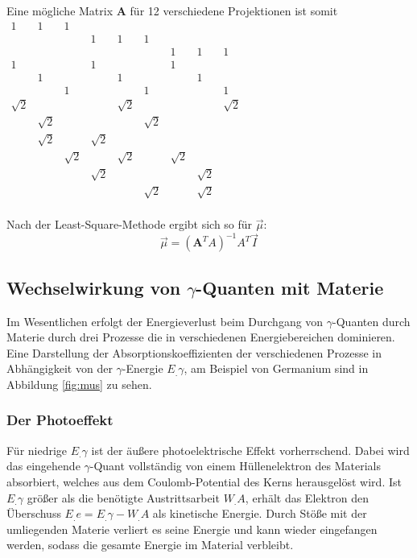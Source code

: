 Eine mögliche Matrix $\mathbf{A}$ für 12 verschiedene Projektionen ist somit
$
\begin{matrix}
1 & 1 & 1 &  &  &  &  &  &  \\
 &  &  & 1 & 1 & 1 &  &  &  \\
 &  &  &  &  &  & 1 & 1 & 1 \\
1 &  &  & 1 &  &  & 1 &  &  \\
 & 1 &  &  & 1 &  &  & 1 &  \\
 &  & 1 &  &  & 1 &  &  & 1 \\
\sqrt{2} &  &  &  & \sqrt{2} &  &  &  & \sqrt{2} \\
 & \sqrt{2} &  &  &  & \sqrt{2} &  &  &  \\
 & \sqrt{2} &  & \sqrt{2} &  &  &  &  &  \\
 &  & \sqrt{2} &  & \sqrt{2} &  & \sqrt{2} &  &  \\
 &  &  & \sqrt{2} &  &  &  & \sqrt{2} &  \\
 &  &  &  &  & \sqrt{2} &  & \sqrt{2} &  \\
\end{matrix}
$

Nach der Least-Square-Methode ergibt sich so für $\vec{\mu}$:
\begin{equation}
\vec{\mu} = (\mathbf{A}^T A)^{-1} A^T \vec{I}\label{eq:mu2}
\end{equation}

\subsection{Wechselwirkung von $\gamma$-Quanten mit Materie}

Im Wesentlichen erfolgt der Energieverlust beim Durchgang von $\gamma$-Quanten durch Materie durch drei Prozesse die in verschiedenen Energiebereichen dominieren.
Eine Darstellung der Absorptionskoeffizienten der verschiedenen Prozesse in Abhängigkeit von der $\gamma$-Energie $E_.{\gamma}$, am Beispiel von Germanium sind in Abbildung \ref{fig:mus} zu sehen.

\subsubsection{Der Photoeffekt}

Für niedrige $E_.{\gamma}$ ist der äußere photoelektrische Effekt vorherrschend.
Dabei wird das eingehende $\gamma$-Quant vollständig von einem Hüllenelektron des Materials absorbiert, welches aus dem Coulomb-Potential des Kerns herausgelöst wird. Ist $E_.{\gamma}$ größer als die benötigte Austrittsarbeit $W_.A$, erhält das Elektron den Überschuss $E_.e = E_.{\gamma} - W_.A$ als kinetische Energie. Durch Stöße mit der umliegenden Materie verliert es seine Energie und kann wieder eingefangen werden, sodass die gesamte Energie im Material verbleibt.

